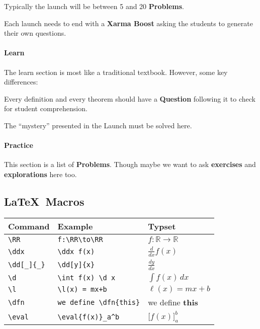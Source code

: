 \documentclass{article}
\newcommand{\RR}{\mathbb R}
\renewcommand{\d}{\,d}
\newcommand{\dd}[2][]{\frac{d #1}{d #2}}
\renewcommand{\l}{\ell}
\newcommand{\ddx}{\frac{d}{dx}}
\newcommand{\dfn}{\textbf}
\newcommand{\eval}[1]{\bigg[ #1 \bigg]}
\begin{document}
Typically the launch will be between 5 and 20 \textbf{Problems}.

Each launch needs to end with a \textbf{Xarma Boost} asking the students to generate their
own questions.


\paragraph{Learn}


The learn section is most like a traditional textbook. However, some key differences:


Every definition and every theorem should have a \textbf{Question}
following it to check for student comprehension.


The ``mystery'' presented in the Launch must be solved here. 



\paragraph{Practice}

This section is a list of \textbf{Problems}. Though maybe we want to
ask \textbf{exercises} and \textbf{explorations} here too.



\subsection*{\LaTeX\ Macros}

\renewcommand{\arraystretch}{2}
\begin{tabular*}{1.0\textwidth}{lll}
\hline
Command & Example & Typset \\
\hline
\verb|\RR| & \verb|f:\RR\to\RR| & $f:\RR\to\RR$\\ 
\verb|\ddx| & \verb|\ddx f(x)| & $\ddx f(x)$\\
\verb|\dd[_]{_}| & \verb|\dd[y]{x}| & $\dd[y]{x}$ \\
\verb|\d | & \verb|\int f(x) \d x| & $\int f(x) \d x$\\
\verb|\l| & \verb|\l(x) = mx+b| & $\l(x) = mx +b$\\
\verb|\dfn| & \verb|we define \dfn{this}| & we define \dfn{this}\\
\verb|\eval| & \verb|\eval{f(x)}_a^b| & $\eval{f(x)}_a^b$
\end{tabular*}
\end{document}
